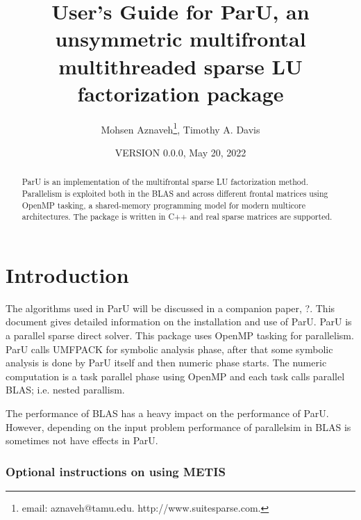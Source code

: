 \documentclass[12pt]{article}
\title{User's Guide for ParU, an unsymmetric multifrontal multithreaded sparse
LU factorization package}
\author{Mohsen Aznaveh\thanks{
email: aznaveh@tamu.edu.
http://www.suitesparse.com.
},
Timothy A. Davis}
\date{VERSION 0.0.0, May 20, 2022}
\begin{document}
\maketitle

\begin{abstract}

ParU is an implementation of the multifrontal sparse LU factorization
method.  Parallelism is exploited both in the BLAS and across different frontal
matrices using OpenMP tasking, a shared-memory programming model for modern 
multicore architectures. The package is written in C++ and real sparse matrices 
are supported.

\end{abstract}

\maketitle

\section{Introduction}
\label{intro}

The algorithms used in ParU will be discussed in a companion paper,
?. This document gives detailed information on the installation
and use of ParU.
ParU is a parallel sparse direct solver. This package uses OpenMP
tasking for parallelism. ParU calls UMFPACK for symbolic analysis phase,
after that some symbolic analysis is done by ParU itself and  then numeric
phase starts. The numeric computation is a task parallel phase using OpenMP
and each task calls parallel BLAS; i.e. nested parallism. 

The performance of BLAS has a heavy impact on the performance of ParU.
However, depending on the input problem performance of parallelsim in BLAS 
is sometimes not have effects in ParU.


\subsubsection{Optional instructions on using METIS}
\end{document}

